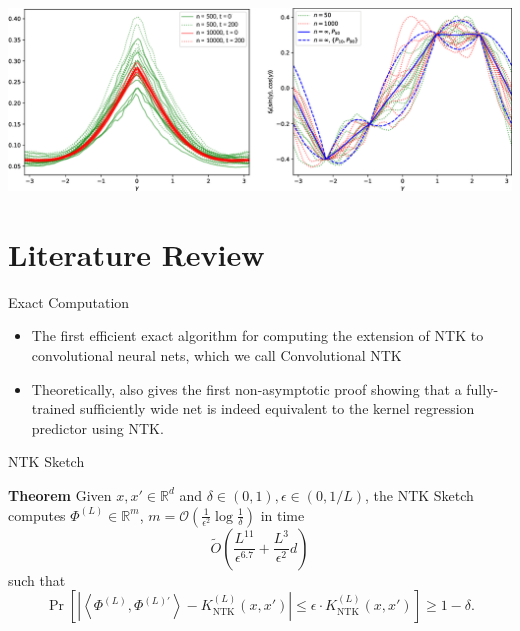 \documentclass[serif, aspectratio=169]{beamer}
\begin{document}
 \begin{frame}
  \centering %
 \includegraphics[width=\textwidth]{pic/NTK_paper_exp.png} %
  \end{frame}
 
 
 
 
 
\section{Literature Review}

\begin{frame}{Exact Computation}
\begin{itemize}
	\item The first efficient exact algorithm for computing the extension of NTK to convolutional neural nets, which we call Convolutional NTK
	\item Theoretically, also
	gives the first non-asymptotic proof showing that a fully-trained sufficiently wide net is indeed equivalent to the kernel regression predictor using NTK.
\end{itemize}
\end{frame}

\begin{frame}{NTK Sketch}
	
	\textbf{Theorem} Given \( x, x' \in \mathbb{R}^d \) and \( \delta \in (0, 1), \epsilon \in (0, 1/L) \), the NTK Sketch computes \( \Phi^{(L)} \in \mathbb{R}^m \), \( m = \mathcal{O}\left(\frac{1}{\epsilon^2} \log \frac{1}{\delta}\right) \) in time
	\[
	\tilde{O}\left( \frac{L^{11}}{\epsilon^{6.7}} + \frac{L^3}{\epsilon^2} d \right)
	\]
	such that
	\[
	\Pr\left[ \left| \left\langle \Phi^{(L)}, \Phi^{(L)'} \right\rangle - K_{\text{NTK}}^{(L)}(x, x') \right| \leq \epsilon \cdot K_{\text{NTK}}^{(L)}(x, x') \right] \geq 1 - \delta.
	\]

\end{frame}
\end{document}
